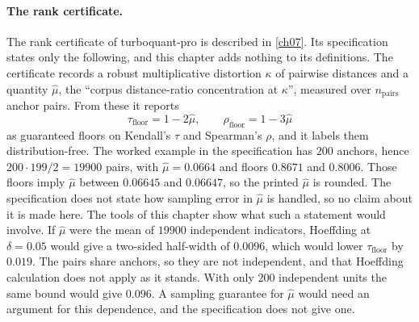 \paragraph{The rank certificate.} The rank certificate of turboquant-pro is described in \cref{ch07}. Its specification states only the following, and this chapter adds nothing to its definitions. The certificate records a robust multiplicative distortion $\kappa$ of pairwise distances and a quantity $\hat\mu$, the ``corpus distance-ratio concentration at $\kappa$'', measured over $n_{\text{pairs}}$ anchor pairs. From these it reports
\begin{equation}
\tau_{\text{floor}}=1-2\hat\mu,\qquad \rho_{\text{floor}}=1-3\hat\mu
\label{eq:ch12:cert}
\end{equation}
as guaranteed floors on Kendall's $\tau$ and Spearman's $\rho$, and it labels them distribution-free. The worked example in the specification has $200$ anchors, hence $200\cdot199/2=19900$ pairs, with $\hat\mu=0.0664$ and floors $0.8671$ and $0.8006$. Those floors imply $\hat\mu$ between $0.06645$ and $0.06647$, so the printed $\hat\mu$ is rounded. The specification does not state how sampling error in $\hat\mu$ is handled, so no claim about it is made here. The tools of this chapter show what such a statement would involve. If $\hat\mu$ were the mean of $19900$ independent indicators, Hoeffding at $\delta=0.05$ would give a two-sided half-width of $0.0096$, which would lower $\tau_{\text{floor}}$ by $0.019$. The pairs share anchors, so they are not independent, and that Hoeffding calculation does not apply as it stands. With only $200$ independent units the same bound would give $0.096$. A sampling guarantee for $\hat\mu$ would need an argument for this dependence, and the specification does not give one.



